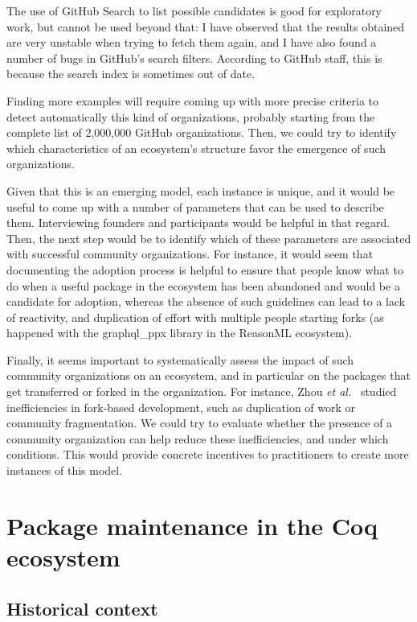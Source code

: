 The use of GitHub Search to list possible candidates is good for exploratory work, but cannot be used beyond that: I have observed that the results obtained are very unstable when trying to fetch them again, and I have also found a number of bugs in GitHub's search filters.
According to GitHub staff, this is because the search index is sometimes out of date.

Finding more examples will require coming up with more precise criteria to detect automatically this kind of organizations, probably starting from the complete list of 2,000,000 GitHub organizations.
Then, we could try to identify which characteristics of an ecosystem's structure favor the emergence of such organizations.

Given that this is an emerging model, each instance is unique, and it would be useful to come up with a number of parameters that can be used to describe them.
Interviewing founders and participants would be helpful in that regard.
Then, the next step would be to identify which of these parameters are associated with successful community organizations.
For instance, it would seem that documenting the adoption process is helpful to ensure that people know what to do when a useful package in the ecosystem has been abandoned and would be a candidate for adoption, whereas the absence of such guidelines can lead to a lack of reactivity, and duplication of effort with multiple people starting forks (as happened with the graphql\_ppx library in the ReasonML ecosystem).

Finally, it seems important to systematically assess the impact of such community organizations on an ecosystem, and in particular on the packages that get transferred or forked in the organization.
For instance, Zhou \emph{et al.}~\cite{zhou2019fork} studied inefficiencies in fork-based development, such as duplication of work or community fragmentation.
We could try to evaluate whether the presence of a community organization can help reduce these inefficiencies, and under which conditions.
This would provide concrete incentives to practitioners to create more instances of this model.

\section{Package maintenance in the Coq ecosystem}

\subsection{Historical context}

